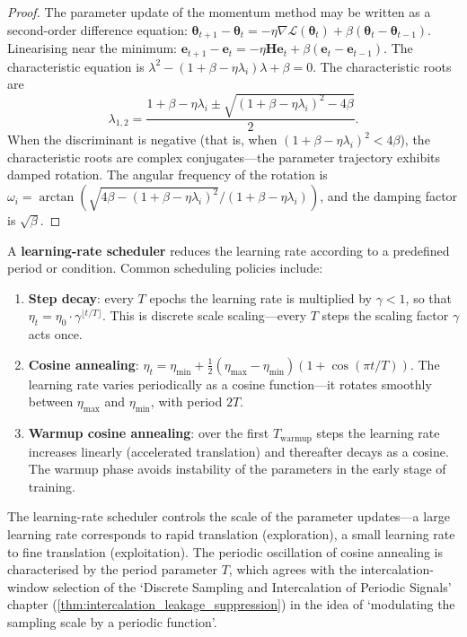 \begin{proof}
The parameter update of the momentum method may be written as a second-order difference equation: $\boldsymbol{\theta}_{t+1} - \boldsymbol{\theta}_t = -\eta \nabla \mathcal{L}(\boldsymbol{\theta}_t) + \beta(\boldsymbol{\theta}_t - \boldsymbol{\theta}_{t-1})$. Linearising near the minimum: $\mathbf{e}_{t+1} - \mathbf{e}_t = -\eta \mathbf{H} \mathbf{e}_t + \beta(\mathbf{e}_t - \mathbf{e}_{t-1})$. The characteristic equation is $\lambda^2 - (1+\beta - \eta \lambda_i)\lambda + \beta = 0$. The characteristic roots are
\[
\lambda_{1,2} = \frac{1+\beta - \eta \lambda_i \pm \sqrt{(1+\beta - \eta \lambda_i)^2 - 4\beta}}{2}.
\]
When the discriminant is negative (that is, when $(1+\beta-\eta\lambda_i)^2 < 4\beta$), the characteristic roots are complex conjugates---the parameter trajectory exhibits damped rotation. The angular frequency of the rotation is $\omega_i = \arctan(\sqrt{4\beta - (1+\beta - \eta \lambda_i)^2}/(1+\beta - \eta \lambda_i))$, and the damping factor is $\sqrt{\beta}$.
\end{proof}

\begin{definition}\label{def:lr_scheduler}
A \textbf{learning-rate scheduler} reduces the learning rate according to a predefined period or condition. Common scheduling policies include:
\begin{enumerate}[label=(\roman*)]
    \item \textbf{Step decay}: every $T$ epochs the learning rate is multiplied by $\gamma < 1$, so that $\eta_t = \eta_0 \cdot \gamma^{\lfloor t/T \rfloor}$. This is discrete scale scaling---every $T$ steps the scaling factor $\gamma$ acts once.
    \item \textbf{Cosine annealing}: $\eta_t = \eta_{\min} + \frac{1}{2}(\eta_{\max} - \eta_{\min})(1 + \cos(\pi t/T))$. The learning rate varies periodically as a cosine function---it rotates smoothly between $\eta_{\max}$ and $\eta_{\min}$, with period $2T$.
    \item \textbf{Warmup cosine annealing}: over the first $T_{\text{warmup}}$ steps the learning rate increases linearly (accelerated translation) and thereafter decays as a cosine. The warmup phase avoids instability of the parameters in the early stage of training.
\end{enumerate}
The learning-rate scheduler controls the scale of the parameter updates---a large learning rate corresponds to rapid translation (exploration), a small learning rate to fine translation (exploitation). The periodic oscillation of cosine annealing is characterised by the period parameter $T$, which agrees with the intercalation-window selection of the `Discrete Sampling and Intercalation of Periodic Signals' chapter (\cref{thm:intercalation_leakage_suppression}) in the idea of `modulating the sampling scale by a periodic function'.
\end{definition}

